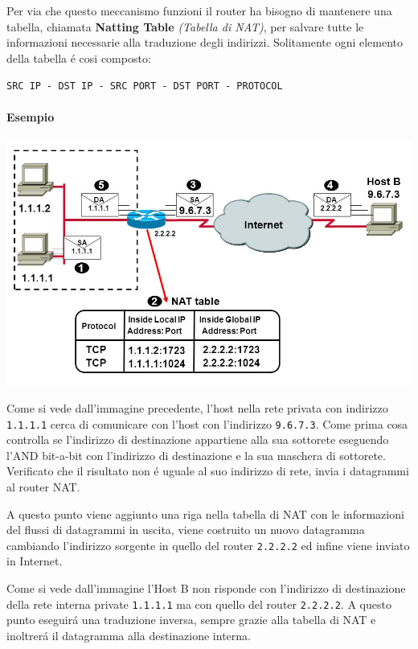 \documentclass[12pt]{article}
\def\code#1{\texttt{#1}}
\begin{document}
Per via che questo meccanismo funzioni il router ha bisogno di mantenere una tabella, chiamata \textbf{Natting Table} 
\textit{(Tabella di NAT)}, per salvare tutte le informazioni necessarie alla traduzione degli indirizzi. Solitamente 
ogni elemento della tabella \'e cosi composto:
\begin{center}
	\code{SRC IP - DST IP - SRC PORT - DST PORT - PROTOCOL}
\end{center}

\clearpage
\paragraph{Esempio}
\begin{center}
	\includegraphics[scale=0.5]{livello_di_rete-img6.png}
\end{center}
Come si vede dall'immagine precedente, l'host nella rete privata con indirizzo \code{1.1.1.1} cerca di comunicare con 
l'host con l'indirizzo \code{9.6.7.3}. Come prima cosa controlla se l'indirizzo di destinazione appartiene alla sua 
sottorete eseguendo l'AND bit-a-bit con l'indirizzo di destinazione e la sua maschera di sottorete. Verificato che il 
risultato non \'e uguale al suo indirizzo di rete, invia i datagrammi al router NAT. 

A questo punto viene aggiunto una riga nella tabella di NAT con le informazioni del flussi di datagrammi in uscita, 
viene costruito un nuovo datagramma cambiando l'indirizzo sorgente in quello del router \code{2.2.2.2} ed infine viene 
inviato in Internet.

Come si vede dall'immagine l'Host B non risponde con l'indirizzo di destinazione della rete interna private 
\code{1.1.1.1} ma con quello del router \code{2.2.2.2}. A questo punto eseguir\'a una traduzione inversa, sempre grazie 
alla tabella di NAT e inoltrer\'a il datagramma alla destinazione interna.
\end{document}
